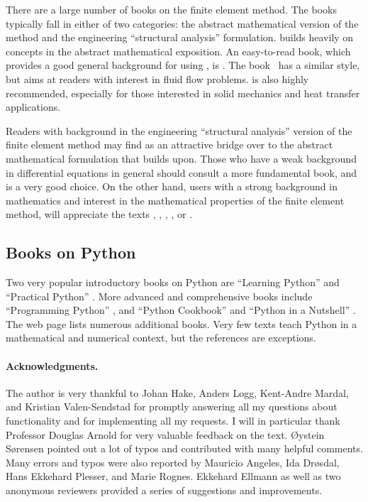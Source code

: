 There are a large number of books on the finite element method.  The books
typically fall in either of two categories: the abstract mathematical
version of the method and the engineering ``structural analysis''
formulation. \fenics{} builds heavily on concepts in the abstract
mathematical exposition.  An easy-to-read book, which provides a good
general background for using \fenics, is \citet{Gockenbach2006}. The
book~\citet{DoneaHuerta2003} has a similar style, but aims at readers
with interest in fluid flow problems. \citet{Hughes1987} is also highly
recommended, especially for those interested in solid mechanics and heat
transfer applications.

Readers with background in the engineering ``structural analysis''
version of the finite element method may find \citet{Bickford1994}
as an attractive bridge over to the abstract mathematical formulation
that \fenics{} builds upon.  Those who have a weak background in
differential equations in general should consult a more fundamental
book, and \citet{ErikssonEstepHansboEtAl1996} is a very good
choice. On the other hand, \fenics{} users with a strong background in
mathematics and interest in the mathematical properties of the finite
element method, will appreciate the texts \citet{BrennerScott2008},
\citet{Braess2007}, \citet{ErnGuermond2004}, \citet{QuarteroniValli2008},
or \citet{Ciarlet2002}.

\subsection{Books on Python}
\label{langtangen:appendix:pybooks}

Two very popular introductory books on Python are ``Learning Python''
\citep{Lutz2007} and ``Practical Python'' \citep{Hetland2002}.
More advanced and comprehensive books include ``Programming Python''
\citep{Lutz2006}, and ``Python Cookbook'' \citep{MartelliAscher2005}
and ``Python in a Nutshell'' \citep{Martelli2006}.  The web
page  lists
numerous additional books.  Very few texts teach Python in
a mathematical and numerical context, but the references
\citet{Langtangen2008,Langtangen20011,Kiusalaas2010} are exceptions.


\paragraph{Acknowledgments.}

The author is very thankful to Johan Hake, Anders Logg, Kent-Andre
Mardal, and Kristian Valen-Sendstad for promptly answering all my
questions about \fenics{} functionality and for implementing all my
requests. I will in particular thank Professor Douglas Arnold for very
valuable feedback on the text. {\O}ystein S{\o}rensen pointed out a lot
of typos and contributed with many helpful comments.  Many errors and
typos were also reported by Mauricio Angeles, Ida Dr{\o}sdal, Hans
Ekkehard Plesser, and Marie Rognes.
Ekkehard Ellmann as well as two anonymous reviewers
provided a series of suggestions and improvements.

\endgroup 